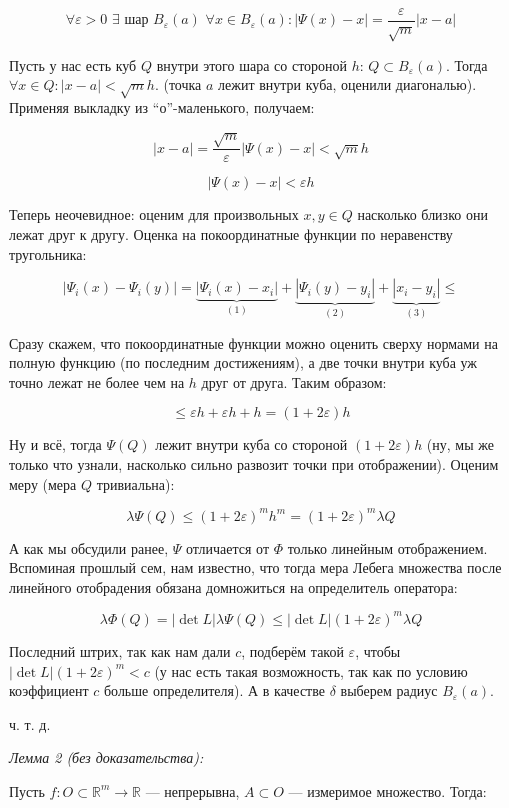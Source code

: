 \documentclass{article}
\def\dbl{\,\,}
\begin{document}
\[\forall \varepsilon > 0 \dbl \exists \text{ шар } B_{\varepsilon}(a) \dbl \forall x \in B_{\varepsilon}(a): |\Psi(x) - x| = \frac{\varepsilon}{\sqrt{m}}|x - a|\]

Пусть у нас есть куб $Q$ внутри этого шара со стороной $h$: $Q \subset B_{\varepsilon}(a)$. Тогда $\forall x \in Q: |x - a| < \sqrt{m}h$. (точка $a$ лежит внутри куба, оценили диагональю). Применяя выкладку из ``о''-маленького, получаем:


\[|x - a| = \frac{\sqrt{m}}{\varepsilon}|\Psi(x) - x| < \sqrt{m}h\]

\[|\Psi(x) - x| < \varepsilon h\]

Теперь неочевидное: оценим для произвольных $x, y \in Q$ насколько близко они лежат друг к другу. Оценка на покоординатные функции по неравенству тругольника:

\[|\Psi_i(x) - \Psi_i(y)| = \underbrace{|\Psi_i(x) - x_i|}_{(1)} + \underbrace{|\Psi_i(y) - y_i|}_{(2)} + \underbrace{|x_i - y_i|}_{(3)} \le\]

Сразу скажем, что покоординатные функции можно оценить сверху нормами на полную функцию (по последним достижениям), а две точки внутри куба уж точно лежат не более чем на $h$ друг от друга. Таким образом:

\[\le \varepsilon h + \varepsilon h + h = (1 + 2\varepsilon) h \]

Ну и всё, тогда $\Psi(Q)$ лежит внутри куба со стороной $(1 + 2\varepsilon)h$ (ну, мы же только что узнали, насколько сильно развозит точки при отображении). Оценим меру (мера $Q$ тривиальна):

\[\lambda\Psi(Q) \le (1 + 2\varepsilon)^mh^m = (1 + 2\varepsilon)^m\lambda Q\]

А как мы обсудили ранее, $\Psi$ отличается от $\Phi$ только линейным отображением. Вспоминая прошлый сем, нам известно, что тогда мера Лебега множества после линейного отобрадения обязана домножиться на определитель оператора:

\[\lambda\Phi(Q) = |\det L|\lambda \Psi(Q) \le |\det L|(1 + 2\varepsilon)^m \lambda Q\]

Последний штрих, так как нам дали $c$, подберём такой $\varepsilon$, чтобы $|\det L|(1 + 2\varepsilon)^m < c$ (у нас есть такая возможность, так как по условию коэффициент $c$ больше определителя). А в качестве $\delta$ выберем радиус $B_{\varepsilon}(a)$.

ч. т. д.

\textit{Лемма 2 (без доказательства):}

Пусть $f: O \subset \mathbb{R}^m \rightarrow \mathbb{R}$ --- непрерывна, $A \subset O$ --- измеримое множество. Тогда:
\end{document}
